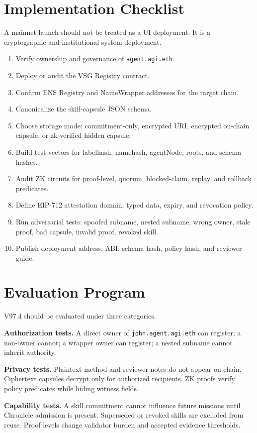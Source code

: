 \documentclass[11pt]{article}
\newcommand{\code}[1]{\texttt{#1}}
\begin{document}
\section{Implementation Checklist}
A mainnet launch should not be treated as a UI deployment. It is a cryptographic and institutional system deployment.
\begin{enumerate}
  \item Verify ownership and governance of \code{agent.agi.eth}.
  \item Deploy or audit the VSG Registry contract.
  \item Confirm ENS Registry and NameWrapper addresses for the target chain.
  \item Canonicalize the skill-capsule JSON schema.
  \item Choose storage mode: commitment-only, encrypted URI, encrypted on-chain capsule, or zk-verified hidden capsule.
  \item Build test vectors for labelhash, namehash, agentNode, roots, and schema hashes.
  \item Audit ZK circuits for proof-level, quorum, blocked-claim, replay, and rollback predicates.
  \item Define EIP-712 attestation domain, typed data, expiry, and revocation policy.
  \item Run adversarial tests: spoofed subname, nested subname, wrong owner, stale proof, bad capsule, invalid proof, revoked skill.
  \item Publish deployment address, ABI, schema hash, policy hash, and reviewer guide.
\end{enumerate}

\section{Evaluation Program}
V97.4 should be evaluated under three categories.

\textbf{Authorization tests.} A direct owner of \code{john.agent.agi.eth} can register; a non-owner cannot; a wrapper owner can register; a nested subname cannot inherit authority.

\textbf{Privacy tests.} Plaintext method and reviewer notes do not appear on-chain. Ciphertext capsules decrypt only for authorized recipients. ZK proofs verify policy predicates while hiding witness fields.

\textbf{Capability tests.} A skill commitment cannot influence future missions until Chronicle admission is present. Superseded or revoked skills are excluded from reuse. Proof levels change validator burden and accepted evidence thresholds.
\end{document}
